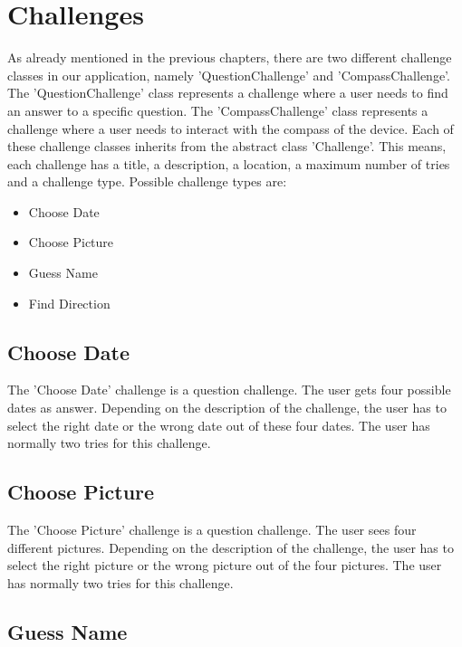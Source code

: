 \chapter{Challenges}

As already mentioned in the previous chapters, there are two different challenge classes in our application, namely 'QuestionChallenge' and 'CompassChallenge'. The 'QuestionChallenge' class represents a challenge where a user needs to find an answer to a specific question. The 'CompassChallenge' class represents a challenge where a user needs to interact with the compass of the device. Each of these challenge classes inherits from the abstract class 'Challenge'. This means, each challenge has a title, a description, a location, a maximum number of tries and a challenge type. Possible challenge types are: \\

\begin{itemize}
	\item Choose Date
	\item Choose Picture
	\item Guess Name
	\item Find Direction
\end{itemize}

\section{Choose Date}

The 'Choose Date' challenge is a question challenge. The user gets four possible dates as answer. Depending on the description of the challenge, the user has to select the right date or the wrong date out of these four dates. The user has normally two tries for this challenge.

\section{Choose Picture}

The 'Choose Picture' challenge is a question challenge. The user sees four different pictures. Depending on the description of the challenge, the user has to select the right picture or the wrong picture out of the four pictures. The user has normally two tries for this challenge.

\section{Guess Name}

